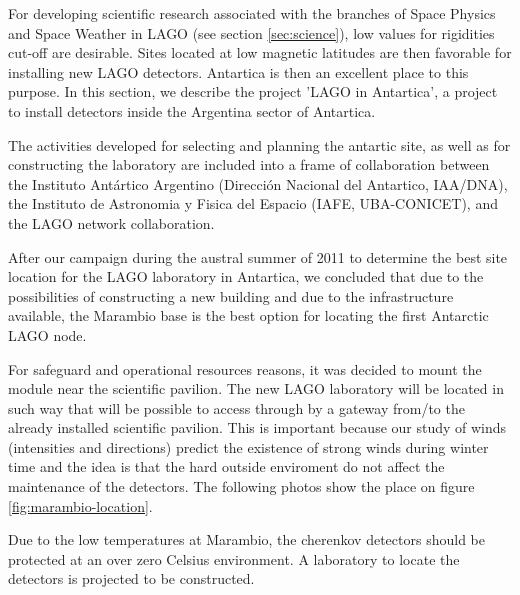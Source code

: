 For developing scientific research associated with the branches of Space
Physics and Space Weather in LAGO (see section \ref{sec:science}), low values
for rigidities cut-off are desirable.  Sites located at low magnetic latitudes
are then favorable for installing new LAGO detectors. Antartica is then an
excellent place to this purpose.  In this section, we describe the project
'LAGO in Antartica', a project to install detectors inside the Argentina sector
of Antartica.


The activities developed for selecting and planning the antartic site, as well
as for constructing the laboratory are included into a frame of collaboration
between the Instituto Ant\'artico Argentino (Direcci\'on Nacional del
Antartico, IAA/DNA), the Instituto de Astronomia y Fisica del Espacio (IAFE,
UBA-CONICET), and the LAGO network collaboration.

After our campaign during the austral summer of 2011 to determine the best site
location for the LAGO laboratory in Antartica, we concluded that due to the
possibilities of constructing a new building and due to the infrastructure
available, the Marambio base is the best option for locating the first
Antarctic LAGO node.

For safeguard and operational resources reasons, it was decided to mount the
module near the scientific pavilion. The new LAGO laboratory will be located
in such way that will be possible to access through by a gateway from/to the
already installed scientific pavilion. This is important because our study of
winds (intensities and directions) predict the existence of strong winds during
winter time and the idea is that the hard outside enviroment do not affect the
maintenance of the detectors. The following photos show the place on figure
\ref{fig:marambio-location}.

Due to the low temperatures at Marambio, the cherenkov detectors should be
protected at an over zero Celsius environment.  A laboratory to locate the
detectors is projected to be constructed. 

